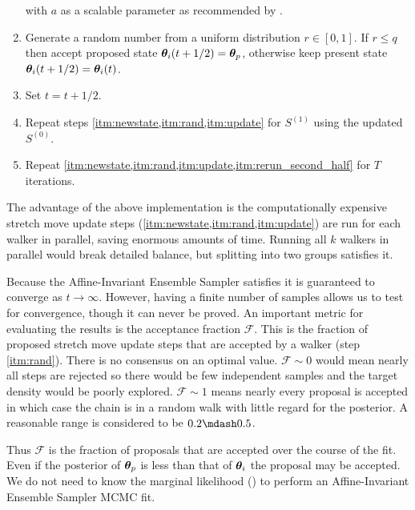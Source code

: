 \begin{enumerate}
\noindent with $a$ as a scalable parameter as recommended by .

\item \label{itm:rand} Generate a random number from a uniform distribution $r \in [0, 1]$.  If $r \leq q$ then accept proposed state
$\boldsymbol{\theta}_i(t + 1/2) = \boldsymbol{\theta}_p$, otherwise keep present state $\boldsymbol{\theta}_i(t + 1/2) = \boldsymbol{\theta}_i(t)$.

\item \label{itm:update}  Set $t = t + 1/2$.

\item \label{itm:rerun_second_half} Repeat steps \cref{itm:newstate,itm:rand,itm:update} for $S^{(1)}$ using the updated $S^{(0)}$.

\item Repeat \cref{itm:newstate,itm:rand,itm:update,itm:rerun_second_half} for $T$ iterations.
\end{enumerate}

The advantage of the above implementation is the computationally expensive stretch move update steps
(\cref{itm:newstate,itm:rand,itm:update}) are run
for each walker in parallel, saving enormous amounts of time.  Running all $k$ walkers in parallel would break detailed balance,
but splitting into two groups satisfies it.

Because the Affine-Invariant Ensemble Sampler satisfies  it is guaranteed
to converge as $t \rightarrow \infty$.  However, having a finite number of samples allows us to test for convergence,
though it can never be proved.  An important metric for evaluating the results is the acceptance fraction
$\mathcal{F}$.  This is the fraction of proposed stretch move update steps that are accepted by a walker (step \cref{itm:rand}).  There is
no consensus on an optimal value.  $\mathcal{F} \sim 0$ would mean nearly all steps are rejected so there would be few independent samples
and the target density would be poorly explored.  $\mathcal{F} \sim 1$ means nearly every proposal is accepted in which case
the chain is in a random walk with little regard for the posterior.  A reasonable range is considered to be $0.2 \mdash 0.5$.

Thus $\mathcal{F}$ is
the fraction of proposals that are accepted over the course of the fit.  Even if the posterior of $\boldsymbol{\theta}_p$ is less than
that of $\boldsymbol{\theta}_i$ the proposal may be accepted.  We do not need to know the marginal
likelihood () to perform an Affine-Invariant Ensemble Sampler MCMC
fit.

